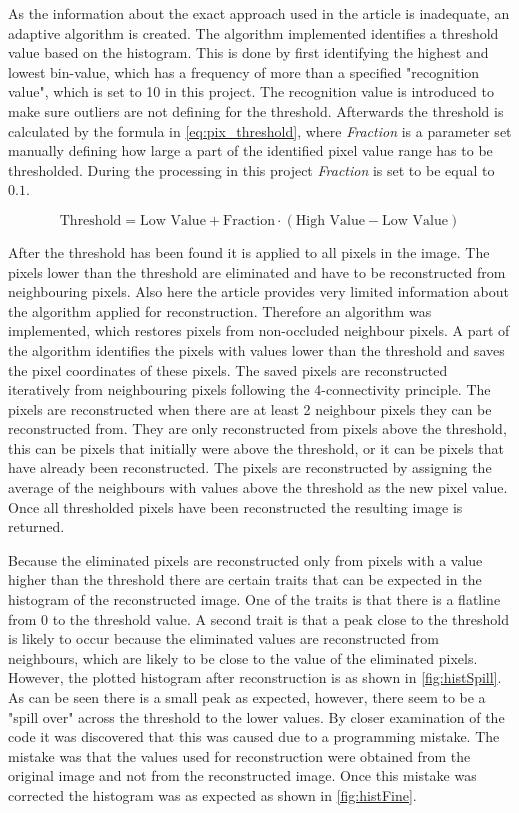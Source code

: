 As the information about the exact approach used in the article is inadequate, an adaptive algorithm is created. The algorithm implemented identifies a threshold value based on the histogram. This is done by first identifying the highest and lowest bin-value, which has a frequency of more than a specified "recognition value", which is set to 10 in this project. The recognition value is introduced to make sure outliers are not defining for the threshold. Afterwards the threshold is calculated by the formula in \autoref{eq:pix_threshold}, where \textit{Fraction} is a parameter set manually defining how large a part of the identified pixel value range has to be thresholded. During the processing in this project \textit{Fraction} is set to be equal to $0.1$. 

\begin{equation}\label{eq:pix_threshold}
	\text{Threshold}=\text{Low~Value}+\text{Fraction}\cdot(\text{High~Value}-\text{Low~Value})
\end{equation}


After the threshold has been found it is applied to all pixels in the image. The pixels lower than the threshold are eliminated and have to be reconstructed from neighbouring pixels. Also here the article provides very limited information about the algorithm applied for reconstruction. Therefore an algorithm was implemented, which restores pixels from non-occluded neighbour pixels. A part of the algorithm identifies the pixels with values lower than the threshold and saves the pixel coordinates of these pixels. The saved pixels are  reconstructed iteratively from neighbouring pixels following the 4-connectivity principle. The pixels are reconstructed when there are at least 2 neighbour pixels they can be reconstructed from. They are only reconstructed from pixels above the threshold, this can be pixels that initially were above the threshold, or it can be pixels that have already been reconstructed. The pixels are reconstructed by assigning the average of the neighbours with values above the threshold as the new pixel value. Once all thresholded pixels have been reconstructed the resulting image is returned.

Because the eliminated pixels are reconstructed only from pixels with a value higher than the threshold there are certain traits that can be expected in the histogram of the reconstructed image. One of the traits is that there is a flatline from 0 to the threshold value. A second trait is that a peak close to the threshold is likely to occur because the eliminated values are reconstructed from neighbours, which are likely to be close to the value of the eliminated pixels. However, the plotted histogram after reconstruction is as shown in \autoref{fig:histSpill}. As can be seen there is a small peak as expected, however, there seem to be a "spill over" across the threshold to the lower values. By closer examination of the code it was discovered that this was caused due to a programming mistake. The mistake was that the values used for reconstruction were obtained from the original image and not from the reconstructed image. Once this mistake was corrected the histogram was as expected as shown in \autoref{fig:histFine}. 

